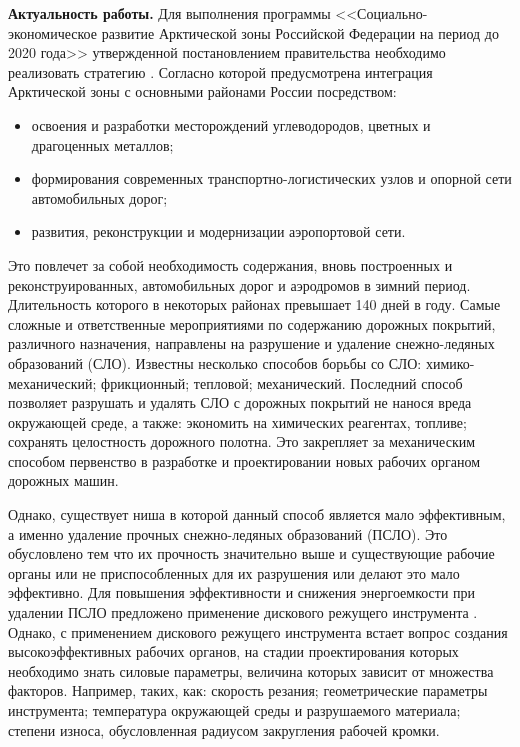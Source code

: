 \textbf{Актуальность работы.} Для выполнения программы <<Социально-экономическое развитие Арктической зоны Российской Федерации на период до 2020 года>> утвержденной постановлением правительства \cite{PostRF} необходимо реализовать стратегию \cite{Strategi}. Согласно которой предусмотрена интеграция Арктической зоны с основными районами России посредством: 
\begin{itemize}
	\item освоения и разработки месторождений углеводородов, цветных и драгоценных металлов;
	\item формирования современных транспортно-логистических узлов и опорной сети автомобильных дорог;
	\item развития, реконструкции и модернизации аэропортовой сети.
\end{itemize}

Это повлечет за собой необходимость содержания, вновь построенных и реконструированных, автомобильных дорог и аэродромов в зимний период. Длительность которого в некоторых районах превышает 140 дней в году. Самые сложные и ответственные мероприятиями по содержанию дорожных покрытий, различного назначения, направлены на разрушение и удаление снежно-ледяных образований (СЛО). Известны несколько способов борьбы со СЛО: химико-механический; фрикционный; тепловой; механический. Последний способ позволяет разрушать и удалять СЛО с дорожных покрытий не нанося вреда окружающей среде, а также: экономить на химических реагентах, топливе; сохранять целостность дорожного полотна. Это закрепляет за механическим способом первенство в разработке и проектировании новых рабочих органом дорожных машин.

Однако, существует ниша в которой данный способ является мало эффективным, а именно удаление прочных снежно-ледяных образований (ПСЛО). Это обусловлено тем что их прочность значительно выше  и существующие рабочие органы или не приспособленных для их разрушения или делают это мало эффективно. Для повышения эффективности и снижения энергоемкости при удалении ПСЛО предложено применение дискового режущего инструмента \cite{GanjaDRI, GanjaPSLO, WorkOrgan}. Однако, с применением дискового режущего инструмента встает вопрос создания высокоэффективных рабочих органов, на стадии проектирования которых необходимо знать силовые параметры, величина которых зависит от множества факторов. Например, таких, как: скорость резания; геометрические параметры инструмента; температура окружающей среды и разрушаемого материала; степени износа, обусловленная радиусом закругления рабочей кромки. 

